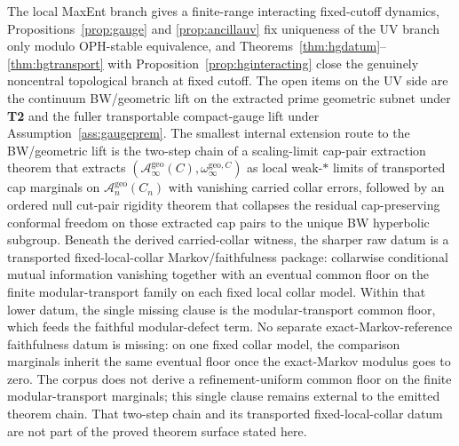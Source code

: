 \documentclass[11pt]{article}
\begin{document}
The local MaxEnt branch gives a finite-range interacting fixed-cutoff dynamics, Propositions~\ref{prop:gauge} and \ref{prop:ancillauv} fix uniqueness of the UV branch only modulo OPH-stable equivalence, and Theorems~\ref{thm:hgdatum}--\ref{thm:hgtransport} with Proposition~\ref{prop:hginteracting} close the genuinely noncentral topological branch at fixed cutoff. The open items on the UV side are the continuum BW/geometric lift on the extracted prime geometric subnet under \textbf{T2} and the fuller transportable compact-gauge lift under Assumption~\ref{ass:gaugeprem}. The smallest internal extension route to the BW/geometric lift is the two-step chain of a scaling-limit cap-pair extraction theorem that extracts \((\mathcal A_\infty^{\mathrm{geo}}(C),\omega_\infty^{\mathrm{geo},C})\) as local weak-\(*\) limits of transported cap marginals on \(\mathcal A_n^{\mathrm{geo}}(C_n)\) with vanishing carried collar errors, followed by an ordered null cut-pair rigidity theorem that collapses the residual cap-preserving conformal freedom on those extracted cap pairs to the unique BW hyperbolic subgroup. Beneath the derived carried-collar witness, the sharper raw datum is a transported fixed-local-collar Markov/faithfulness package: collarwise conditional mutual information vanishing together with an eventual common floor on the finite modular-transport family on each fixed local collar model. Within that lower datum, the single missing clause is the modular-transport common floor, which feeds the faithful modular-defect term. No separate exact-Markov-reference faithfulness datum is missing: on one fixed collar model, the comparison marginals inherit the same eventual floor once the exact-Markov modulus goes to zero. The corpus does not derive a refinement-uniform common floor on the finite modular-transport marginals; this single clause remains external to the emitted theorem chain. That two-step chain and its transported fixed-local-collar datum are not part of the proved theorem surface stated here.
\end{document}
